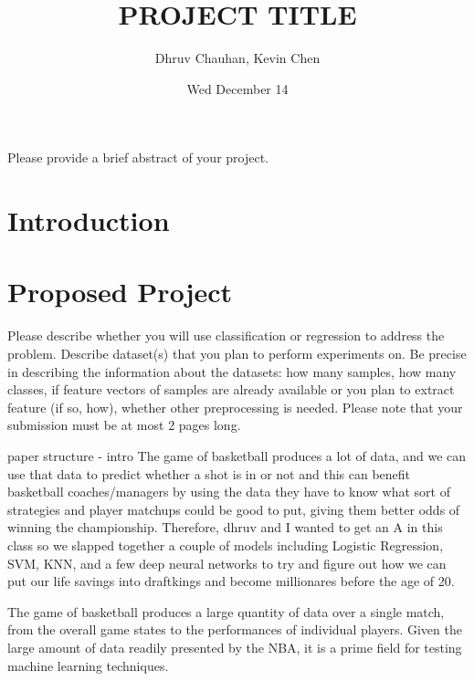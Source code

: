 \documentclass[12pt]{article}
\title{PROJECT TITLE}
\author{Dhruv Chauhan, Kevin Chen}
\date{Wed December  14}
\begin{document}
\maketitle

\abstract
Please provide a brief abstract of your project.

\section{Introduction}


\section{Proposed Project}
Please describe whether you will use classification or regression to address the problem. Describe dataset(s) that you plan to perform experiments on. Be precise in describing the information about the datasets: how many samples, how many classes, if feature vectors of samples are already available or you plan to extract feature (if so, how), whether other preprocessing is needed. Please note that your submission must be at most 2 pages long.



paper structure
- intro
The game of basketball produces a lot of data, and we can use that data to predict whether a shot is in or not and this can benefit basketball coaches/managers by using the data they have to know what sort of strategies and player matchups could be good to put, giving them better odds of winning the championship. Therefore, dhruv and I wanted to get an A in this class so we slapped together a couple of models including Logistic Regression, SVM, KNN, and a few deep neural networks to try and figure out how we can put our life savings into draftkings and become millionares before the age of 20.

The game of basketball produces a large quantity of data over a single match, from the overall game states to the performances of individual players. Given the large amount of data readily presented by the NBA, it is a prime field for testing machine learning techniques.
\end{document}
